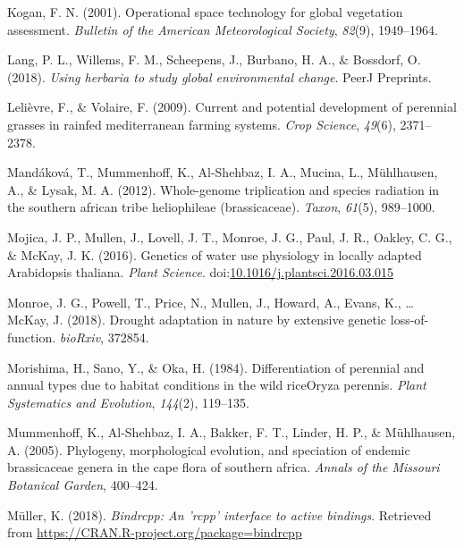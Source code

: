 \documentclass[man,floatsintext]{apa6}
\theoremstyle{definition}
\theoremstyle{definition}
\theoremstyle{definition}
\theoremstyle{remark}
\begin{document}
\leavevmode\hypertarget{ref-kogan2001operational}{}%
Kogan, F. N. (2001). Operational space technology for global vegetation
assessment. \emph{Bulletin of the American Meteorological Society},
\emph{82}(9), 1949--1964.

\leavevmode\hypertarget{ref-lang2018using}{}%
Lang, P. L., Willems, F. M., Scheepens, J., Burbano, H. A., \& Bossdorf,
O. (2018). \emph{Using herbaria to study global environmental change}.
PeerJ Preprints.

\leavevmode\hypertarget{ref-lelievre2009current}{}%
Lelièvre, F., \& Volaire, F. (2009). Current and potential development
of perennial grasses in rainfed mediterranean farming systems.
\emph{Crop Science}, \emph{49}(6), 2371--2378.

\leavevmode\hypertarget{ref-mandakova2012whole}{}%
Mandáková, T., Mummenhoff, K., Al-Shehbaz, I. A., Mucina, L.,
Mühlhausen, A., \& Lysak, M. A. (2012). Whole-genome triplication and
species radiation in the southern african tribe heliophileae
(brassicaceae). \emph{Taxon}, \emph{61}(5), 989--1000.

\leavevmode\hypertarget{ref-Mojica2016}{}%
Mojica, J. P., Mullen, J., Lovell, J. T., Monroe, J. G., Paul, J. R.,
Oakley, C. G., \& McKay, J. K. (2016). Genetics of water use physiology
in locally adapted Arabidopsis thaliana. \emph{Plant Science}.
doi:\href{https://doi.org/10.1016/j.plantsci.2016.03.015}{10.1016/j.plantsci.2016.03.015}

\leavevmode\hypertarget{ref-monroe2018drought}{}%
Monroe, J. G., Powell, T., Price, N., Mullen, J., Howard, A., Evans, K.,
\ldots{} McKay, J. (2018). Drought adaptation in nature by extensive
genetic loss-of-function. \emph{bioRxiv}, 372854.

\leavevmode\hypertarget{ref-morishima1984differentiation}{}%
Morishima, H., Sano, Y., \& Oka, H. (1984). Differentiation of perennial
and annual types due to habitat conditions in the wild riceOryza
perennis. \emph{Plant Systematics and Evolution}, \emph{144}(2),
119--135.

\leavevmode\hypertarget{ref-mummenhoff2005phylogeny}{}%
Mummenhoff, K., Al-Shehbaz, I. A., Bakker, F. T., Linder, H. P., \&
Mühlhausen, A. (2005). Phylogeny, morphological evolution, and
speciation of endemic brassicaceae genera in the cape flora of southern
africa. \emph{Annals of the Missouri Botanical Garden}, 400--424.

\leavevmode\hypertarget{ref-R-bindrcpp}{}%
Müller, K. (2018). \emph{Bindrcpp: An 'rcpp' interface to active
bindings}. Retrieved from
\url{https://CRAN.R-project.org/package=bindrcpp}
\end{document}
